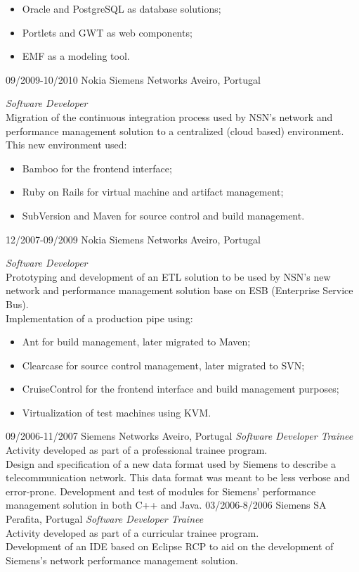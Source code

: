 \documentclass[]{friggeri-cv}
\begin{document}
\begin{entrylist}
{\begin{itemize}
\item Oracle and PostgreSQL as database solutions;
\item Portlets and GWT as web components;
\item EMF as a modeling tool.
\end{itemize}
}
\entry
{09/2009-10/2010}
{Nokia Siemens Networks}
{Aveiro, Portugal}
{\emph{Software Developer} \\
Migration of the continuous integration process used by NSN's network and
performance management solution to a centralized (cloud based) environment.
This new environment used:
\begin{itemize}
\item Bamboo for the frontend interface;
\item Ruby on Rails for virtual machine and artifact management;
\item SubVersion and Maven for source control and build management.
\end{itemize}
}
\end{entrylist}
\begin{entrylist}
\entry
{12/2007-09/2009}
{Nokia Siemens Networks}
{Aveiro, Portugal}
{\emph{Software Developer} \\
Prototyping and development of an ETL solution to be used by NSN's new network and performance management solution base on ESB (Enterprise Service Bus). \\
Implementation of a production pipe using:
\begin{itemize}
\item Ant for build management, later migrated to Maven;
\item Clearcase for source control management, later migrated to SVN;
\item CruiseControl for the frontend interface and build management purposes;
\item Virtualization of test machines using KVM.
\end{itemize}
}
\entry
{09/2006-11/2007}
{Siemens Networks}
{Aveiro, Portugal}
{\emph{Software Developer Trainee} \\
Activity developed as part of a professional trainee program.\\
Design and specification of a new data format used by Siemens to describe a
telecommunication network. This data format was meant to be less verbose and
error-prone. Development and test of modules for Siemens' performance
management solution in both C++ and Java.
}
\entry
{03/2006-8/2006}
{Siemens SA}
{Perafita, Portugal}
{\emph{Software Developer Trainee} \\
Activity developed as part of a curricular trainee program.\\
Development of an IDE based on Eclipse RCP to aid on the development of
Siemens’s network performance management solution.
}
\end{entrylist}
\end{document}
